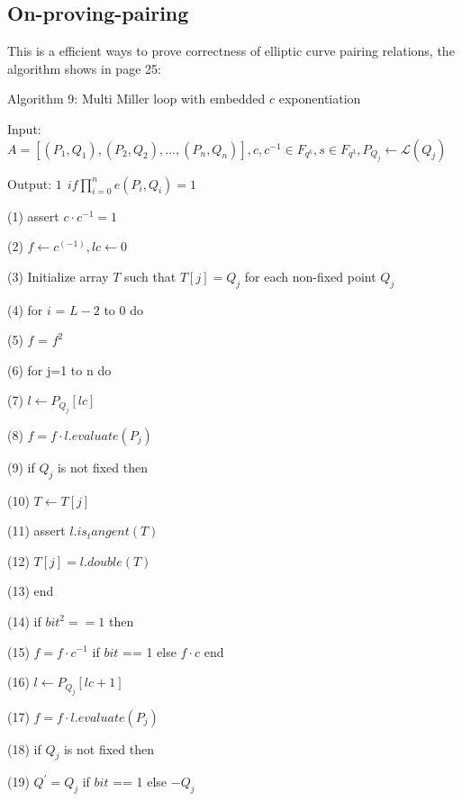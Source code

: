 \subsection{On-proving-pairing}

This is a efficient ways to prove correctness of elliptic curve pairing relations, the algorithm shows in page 25:

Algorithm 9: Multi Miller loop with embedded $c$ exponentiation 

Input: $\displaystyle A = [(P_1,Q_1), (P_2,Q_2),...,(P_n,Q_n)],c, c^{-1} \in F_{q^k},s \in F_{q^3},P_{Q_j} \leftarrow \mathcal{L}(Q_j)$ 

Output: $\displaystyle 1 \ \ if \prod_{i=0}^{n}e(P_i, Q_i) = 1 $ 

(1) assert $\displaystyle c \cdot c^{-1} = 1 $ 

(2) $\displaystyle f \leftarrow c^(-1), lc \leftarrow 0 $ 

(3) Initialize array $T$ such that $\displaystyle T[j] = Q_j $ for each non-fixed point $Q_j$ 

(4) for $i$ = $L-2$ to $0$ do 

(5) \indent $f$ = $f^2$ 

(6) \indent for j=1 to n do 

(7) \indent \indent $\displaystyle l \leftarrow P_{Q_j}[lc] $ 

(8) \indent \indent $\displaystyle f = f \cdot l.evaluate(P_j) $  

(9) \indent \indent if $Q_j$ is not fixed then 

(10) \indent \indent \indent $\displaystyle T \leftarrow T[j] $ 

(11) \indent \indent \indent assert $\displaystyle l.is_tangent(T) $ 

(12) \indent \indent \indent $\displaystyle T[j] = l.double(T) $ 

(13) \indent \indent end 

(14) \indent \indent if $bit^2 == 1$ then 

(15) \indent \indent \indent $\displaystyle f = f \cdot c^{-1}$ if $bit$ == 1 else $\displaystyle f \cdot c$ end 

(16) \indent \indent \indent $\displaystyle l \leftarrow P_{Q_j}[lc+1] $ 

(17) \indent \indent \indent $\displaystyle f = f \cdot l.evaluate(P_{j})$ 

(18) \indent \indent \indent if $Q_j$ is not fixed then 

(19) \indent \indent \indent \indent $\displaystyle Q^{'} = Q_j $ if $bit$ == 1 else $\displaystyle -Q_j $ 


